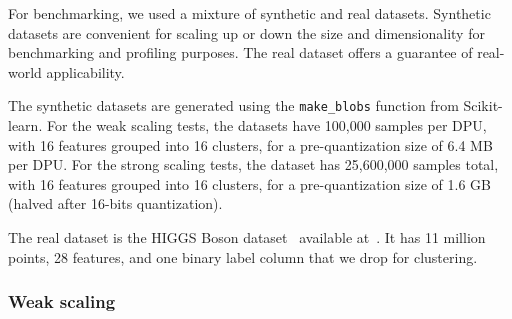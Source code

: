 For benchmarking, we used a mixture of synthetic and real datasets. Synthetic datasets are convenient for scaling up or down the size and dimensionality for benchmarking and profiling purposes. The real dataset offers a guarantee of real-world applicability.

The synthetic datasets are generated using the \verb|make_blobs| function from Scikit-learn. For the weak scaling tests, the datasets have 100,000 samples per DPU, with 16 features grouped into 16 clusters, for a pre-quantization size of 6.4 MB per DPU. For the strong scaling tests, the dataset has 25,600,000 samples total, with 16 features grouped into 16 clusters, for a pre-quantization size of 1.6 GB (halved after 16-bits quantization).

The real dataset is the HIGGS Boson dataset~\cite{baldi2014searching} available at~\cite{Dua:2019}. It has 11 million points, 28 features, and one binary label column that we drop for clustering.

\subsubsection{Weak scaling}

